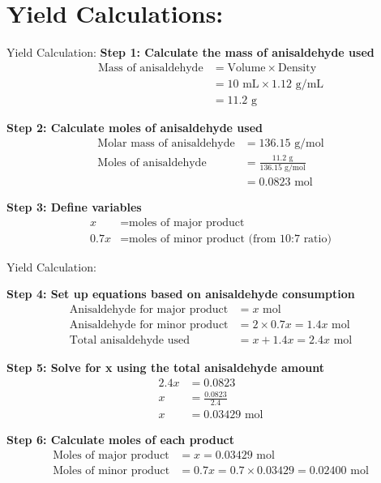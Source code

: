 \documentclass[aspectratio=169, 9pt]{beamer}
\begin{document}
\section{Yield Calculations:}
\begin{frame}{Yield Calculation:}
\textbf{Step 1: Calculate the mass of anisaldehyde used}
\begin{align}
\text{Mass of anisaldehyde} &= \text{Volume} \times \text{Density} \\
&= 10 \text{ mL} \times 1.12 \text{ g/mL} \\
&= 11.2 \text{ g}
\end{align}

\textbf{Step 2: Calculate moles of anisaldehyde used}
\begin{align}
\text{Molar mass of anisaldehyde} &= 136.15 \text{ g/mol} \\
\text{Moles of anisaldehyde} &= \frac{11.2 \text{ g}}{136.15 \text{ g/mol}} \\
&= 0.0823 \text{ mol}
\end{align}

\textbf{Step 3: Define variables}
\begin{align}
x &= \text{moles of major product} \\
0.7x &= \text{moles of minor product (from 10:7 ratio)}
\end{align}
\end{frame}
\begin{frame}{Yield Calculation:}
    

\textbf{Step 4: Set up equations based on anisaldehyde consumption}
\begin{align}
\text{Anisaldehyde for major product} &= x \text{ mol} \\
\text{Anisaldehyde for minor product} &= 2 \times 0.7x = 1.4x \text{ mol} \\
\text{Total anisaldehyde used} &= x + 1.4x = 2.4x \text{ mol}
\end{align}

\textbf{Step 5: Solve for x using the total anisaldehyde amount}
\begin{align}
2.4x &= 0.0823 \\
x &= \frac{0.0823}{2.4} \\
x &= 0.03429 \text{ mol}
\end{align}

\textbf{Step 6: Calculate moles of each product}
\begin{align}
\text{Moles of major product} &= x = 0.03429 \text{ mol} \\
\text{Moles of minor product} &= 0.7x = 0.7 \times 0.03429 = 0.02400 \text{ mol}
\end{align}
\end{frame}
\end{document}
